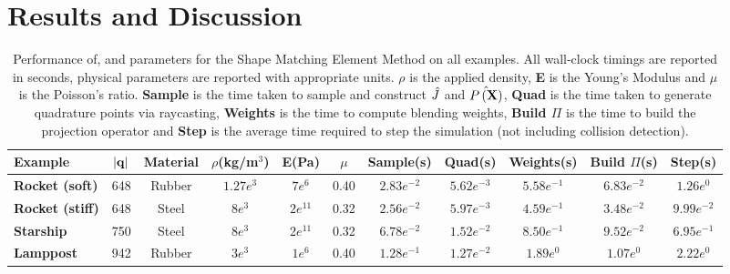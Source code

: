 %
\section{Results and Discussion}

\begin{table}[h]
  \caption{Performance of, and parameters for the Shape Matching Element Method on all examples. All wall-clock timings are reported in seconds, physical  parameters are
  reported with appropriate units. $\rho$ is the applied density, \textbf{E} is the  Young's Modulus and $\mu$ is the Poisson's ratio.
  \textbf{Sample} is the time taken to sample and construct $\hat{J}$ and $\hat{P\left(\mathbf{X}\right)}$, \textbf{Quad} is the time taken to generate quadrature points via raycasting,
  \textbf{Weights} is the time to compute blending weights, \textbf{Build $\Pi$} is the time to build the projection operator and  \textbf{Step} is the average time required to step the simulation (not including collision detection).
  }
  \label{tbl:perf}
  \begin{center}
  \begin{tabular}{l c c c c c c c c c c}
   \textbf{Example} & $|\mathbf{q}|$ & \textbf{Material}&  $\rho$(kg/m$^3$) & \textbf{E}(Pa) & $\mu$ &\textbf{Sample}(s) & \textbf{Quad}(s)& \textbf{Weights}(s) & \textbf{Build $\Pi$}(s)& \textbf{Step}(s)\\
   \hline 
   \rowcolor[HTML]{DAE8FC} 
   \rowcolor[HTML]{DAE8FC} 
   \textbf{Rocket (soft)}           & 648 & Rubber & $1.27 e^3$ & $7 e^6$ & 0.40 & $2.83 e^{-2}$ & $5.62 e^{-3}$ & $5.58 e^{-1}$ & $6.83 e^{-2}$ & $1.26 e^{0}$ \\
   \textbf{Rocket (stiff)}          & 648 & Steel & $8 e^3$ & $2 e^{11}$ & 0.32 & $2.56 e^{-2}$ & $5.97 e^{-3}$ & $4.59 e^{-1}$ & $3.48 e^{-2}$ & $9.99 e^{-2}$ \\
   \rowcolor[HTML]{DAE8FC} 
   \textbf{Starship}                & 750 & Steel & $8 e^3$ & $2 e^{11}$ & 0.32 & $6.78 e^{-2}$ & $1.52 e^{-2}$ & $8.50 e^{-1}$ & $9.52 e^{-2}$ & $6.95 e^{-1}$ \\
   \textbf{Lamppost}                & 942 & Rubber & $3 e^3$ & $1 e^6$ & 0.40 & $1.28 e^{-1}$ & $1.27 e^{-2}$ & $1.89 e^{0}$ & $1.07 e^{0}$ & $2.22 e^{0}$ \\

\end{tabular}
\end{center}
\end{table}
